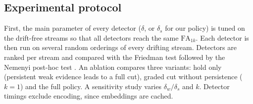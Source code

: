 \documentclass[conference]{IEEEtran}
\begin{document}
\subsection{Experimental protocol}
\label{sec:protocol}
First, the main parameter of every detector ($\delta$, or $\delta_s$ for our policy) is tuned on the drift-free streams so that all detectors reach the same $\mathrm{FA}_{1k}$. Each detector is then run on several random orderings of every drifting stream. Detectors are ranked per stream and compared with the Friedman test followed by the Nemenyi post-hoc test \cite{demsar2006}. An ablation compares three variants: hold only (persistent weak evidence leads to a full cut), graded cut without persistence ($k=1$) and the full policy. A sensitivity study varies $\delta_w/\delta_s$ and $k$. Detector timings exclude encoding, since embeddings are cached.
\end{document}
